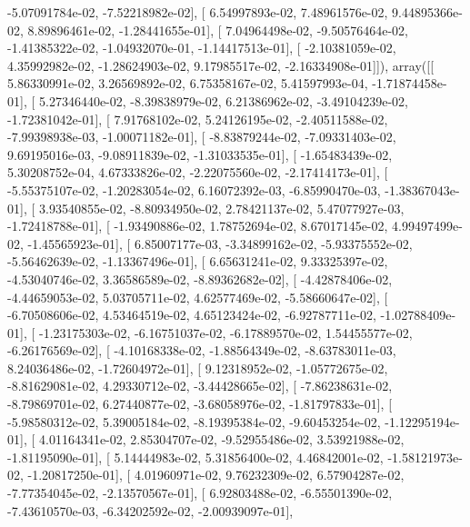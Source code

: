 \documentclass{article}
\begin{document}
         -5.07091784e-02,  -7.52218982e-02],
       [  6.54997893e-02,   7.48961576e-02,   9.44895366e-02,
          8.89896461e-02,  -1.28441655e-01],
       [  7.04964498e-02,  -9.50576464e-02,  -1.41385322e-02,
         -1.04932070e-01,  -1.14417513e-01],
       [ -2.10381059e-02,   4.35992982e-02,  -1.28624903e-02,
          9.17985517e-02,  -2.16334908e-01]]), array([[  5.86330991e-02,   3.26569892e-02,   6.75358167e-02,
          5.41597993e-04,  -1.71874458e-01],
       [  5.27346440e-02,  -8.39838979e-02,   6.21386962e-02,
         -3.49104239e-02,  -1.72381042e-01],
       [  7.91768102e-02,   5.24126195e-02,  -2.40511588e-02,
         -7.99398938e-03,  -1.00071182e-01],
       [ -8.83879244e-02,  -7.09331403e-02,   9.69195016e-03,
         -9.08911839e-02,  -1.31033535e-01],
       [ -1.65483439e-02,   5.30208752e-04,   4.67333826e-02,
         -2.22075560e-02,  -2.17414173e-01],
       [ -5.55375107e-02,  -1.20283054e-02,   6.16072392e-03,
         -6.85990470e-03,  -1.38367043e-01],
       [  3.93540855e-02,  -8.80934950e-02,   2.78421137e-02,
          5.47077927e-03,  -1.72418788e-01],
       [ -1.93490886e-02,   1.78752694e-02,   8.67017145e-02,
          4.99497499e-02,  -1.45565923e-01],
       [  6.85007177e-03,  -3.34899162e-02,  -5.93375552e-02,
         -5.56462639e-02,  -1.13367496e-01],
       [  6.65631241e-02,   9.33325397e-02,  -4.53040746e-02,
          3.36586589e-02,  -8.89362682e-02],
       [ -4.42878406e-02,  -4.44659053e-02,   5.03705711e-02,
          4.62577469e-02,  -5.58660647e-02],
       [ -6.70508606e-02,   4.53464519e-02,   4.65123424e-02,
         -6.92787711e-02,  -1.02788409e-01],
       [ -1.23175303e-02,  -6.16751037e-02,  -6.17889570e-02,
          1.54455577e-02,  -6.26176569e-02],
       [ -4.10168338e-02,  -1.88564349e-02,  -8.63783011e-03,
          8.24036486e-02,  -1.72604972e-01],
       [  9.12318952e-02,  -1.05772675e-02,  -8.81629081e-02,
          4.29330712e-02,  -3.44428665e-02],
       [ -7.86238631e-02,  -8.79869701e-02,   6.27440877e-02,
         -3.68058976e-02,  -1.81797833e-01],
       [ -5.98580312e-02,   5.39005184e-02,  -8.19395384e-02,
         -9.60453254e-02,  -1.12295194e-01],
       [  4.01164341e-02,   2.85304707e-02,  -9.52955486e-02,
          3.53921988e-02,  -1.81195090e-01],
       [  5.14444983e-02,   5.31856400e-02,   4.46842001e-02,
         -1.58121973e-02,  -1.20817250e-01],
       [  4.01960971e-02,   9.76232309e-02,   6.57904287e-02,
         -7.77354045e-02,  -2.13570567e-01],
       [  6.92803488e-02,  -6.55501390e-02,  -7.43610570e-03,
         -6.34202592e-02,  -2.00939097e-01],
\end{document}
